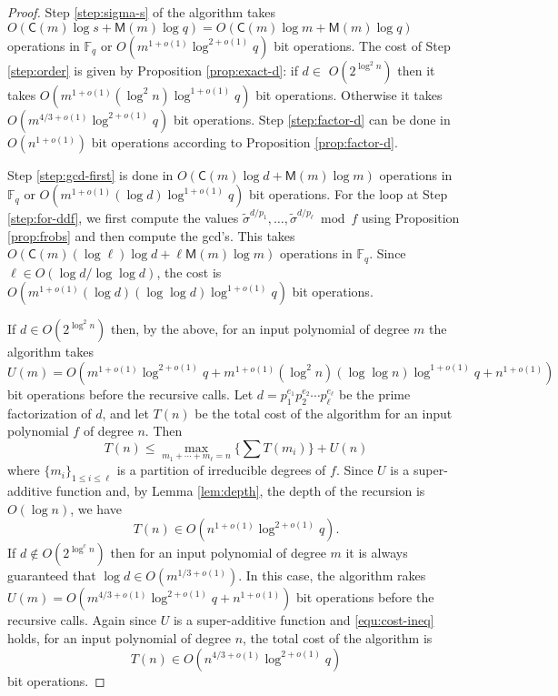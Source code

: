 \documentclass{article}
\theoremstyle{plain}
\theoremstyle{definition}
\def\F{\ensuremath{\mathbb{F}}}
\def\MM{\ensuremath{\mathsf{M}}}
\def\CC{\ensuremath{\mathsf{C}}}
\begin{document}
\begin{proof}
	Step \ref{step:sigma-s} of the algorithm takes $O(\CC(m)\log s + \MM(m)\log q) = O(\CC(m)\log m 
	+ \MM(m)\log q)$ operations in $\F_q$ or $O(m^{1 + o(1)}\log^{2 + o(1)}q)$ bit operations. The 
	cost of Step \ref{step:order} is given by Proposition \ref{prop:exact-d}: if $d \in $ 
	$O(2^{\log^2n})$ then it takes $O(m^{1 + o(1)} (\log^2n) \log^{1 + o(1)}q)$ bit operations. 
	Otherwise it takes $O(m^{4 / 3 + o(1)} \log^{2 + o(1)}q)$ bit operations. Step 
	\ref{step:factor-d} can be done in $O(n^{1 + o(1)})$ bit operations according to Proposition 
	\ref{prop:factor-d}. 
	
	Step \ref{step:gcd-first} is done in $O(\CC(m)\log d + \MM(m)\log m)$ operations in $\F_q$ 
	or $O(m^{1 + o(1)}(\log d)\log^{1 + o(1)}q)$ bit operations. For the loop at Step 
	\ref{step:for-ddf}, we first compute the values $\tilde{\sigma}^{d / p_1}, \dots, 
	\tilde{\sigma}^{d / p_\ell} \bmod f$ using Proposition \ref{prop:frobs} and then compute the 
	gcd's. This takes $O(\CC(m)(\log \ell)\log d + \ell\MM(m)\log m)$ operations in $\F_q$. Since 
	$\ell \in O(\log d / \log\log d)$, the cost is $O(m^{1 + o(1)}(\log d)(\log \log d)\log^{1 + 
	o(1)}q)$ bit operations.
	
	If $d \in O(2^{\log^2n})$ then, by the above, for an input polynomial of degree $m$ the 
	algorithm takes 
	\[ U(m) = O(m^{1 + o(1)}\log^{2 + o(1)}q + m^{1 + o(1)}(\log^2n)(\log \log n)\log^{1 + o(1)}q + 
	n^{1 + o(1)})
	\]
	bit operations before the recursive calls. Let $d = p_1^{e_1} p_2^{e_2} \cdots p_\ell^{e_\ell}$ 
	be the prime factorization of $d$, and let $T(n)$ be the total cost of the algorithm for an 
	input polynomial $f$ of degree $n$. Then
	\begin{equation}
	\label{equ:cost-ineq}
		T(n) \le \max_{m_1 + \cdots + m_\ell = n} \{ \sum T(m_i) \} + U(n)
	\end{equation}
	where $\{ m_i \}_{1 \le i \le \ell}$ is a partition of irreducible degrees of $f$. Since $U$ is 
	a super-additive function and, by Lemma \ref{lem:depth}, the depth of the recursion is $O(\log 
	n)$, we have
	\[ T(n) \in O(n^{1 + o(1)} \log^{2 + o(1)}q). \]
	If $d \notin O(2^{\log^cn})$ then for an input polynomial of degree $m$ it is always guaranteed 
	that $\log d \in O(m^{1 / 3 + o(1)})$. In this case, the algorithm rakes $U(m) = O(m^{4 / 3 + 
	o(1)} \log^{2 + o(1)}q  + n^{1 + o(1)})$ bit operations before the recursive calls. Again since 
	$U$ is a super-additive function and \eqref{equ:cost-ineq} holds, for an input polynomial of 
	degree $n$, the total cost of the algorithm is
	\[ T(n) \in O(n^{4 / 3 + o(1)} \log^{2 + o(1)}q) \]
	bit operations.
\end{proof}







\end{document}
